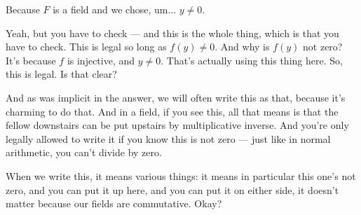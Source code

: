 \begin{student}
Because $F$ is a field and we chose, um... $y \ne 0$.
\end{student}

\begin{speech}[00:21:58 - 00:23:11]
Yeah, but you have to check --- and this is the whole thing, which is that you have to check. This is legal so long as $f(y) \neq 0$.  And why is $f(y)$ not zero? It's because $f$ is injective, and $y \neq 0$.  That's actually using this thing here. So, this is legal. Is that clear?

And as was implicit in the answer, we will often write this as that,  because it's charming to do that. And in a field, if you see this, all that means is that the fellow downstairs can be put upstairs by multiplicative inverse. And you're only legally allowed to write it if you know this is not zero --- just like in normal arithmetic, you can't divide by zero.

When we write this, it means various things: it means in particular this one's not zero, and you can put it up here, and you can put it on either side, it doesn't matter because our fields are commutative. Okay?
\end{speech}

